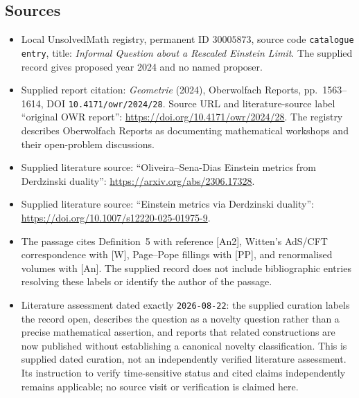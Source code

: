 \documentclass[11pt]{article}
\begin{document}
\subsection{Sources}
\begin{itemize}
\item Local UnsolvedMath registry, permanent ID \(30005873\), source code \texttt{catalogue entry}, title: \emph{Informal Question about a Rescaled Einstein Limit}. The supplied record gives proposed year 2024 and no named proposer.
\item Supplied report citation: \emph{Geometrie} (2024), Oberwolfach Reports, pp.~1563--1614, DOI \texttt{10.4171/owr/2024/28}. Source URL and literature-source label ``original OWR report'': \url{https://doi.org/10.4171/owr/2024/28}. The registry describes Oberwolfach Reports as documenting mathematical workshops and their open-problem discussions.
\item Supplied literature source: ``Oliveira--Sena-Dias Einstein metrics from Derdzinski duality'': \url{https://arxiv.org/abs/2306.17328}.
\item Supplied literature source: ``Einstein metrics via Derdzinski duality'': \url{https://doi.org/10.1007/s12220-025-01975-9}.
\item The passage cites Definition~5 with reference [An2], Witten's AdS/CFT correspondence with [W], Page--Pope fillings with [PP], and renormalised volumes with [An]. The supplied record does not include bibliographic entries resolving these labels or identify the author of the passage.
\item Literature assessment dated exactly \texttt{2026-08-22}: the supplied curation labels the record open, describes the question as a novelty question rather than a precise mathematical assertion, and reports that related constructions are now published without establishing a canonical novelty classification. This is supplied dated curation, not an independently verified literature assessment. Its instruction to verify time-sensitive status and cited claims independently remains applicable; no source visit or verification is claimed here.
\end{itemize}
\end{document}
